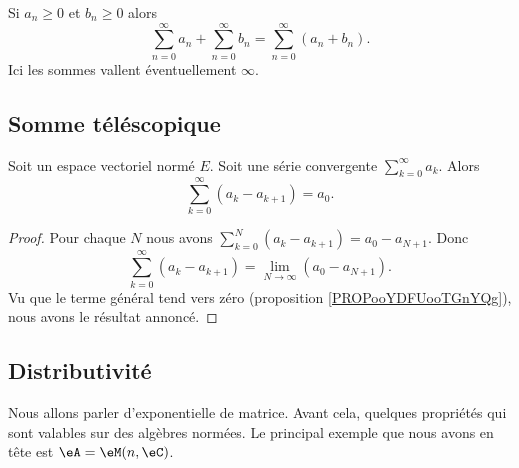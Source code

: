 \begin{proposition}		\label{PROPooQCOBooAMnljj}
	Si \( a_n\geq 0\) et \( b_n\geq 0\) alors
	\begin{equation}
		\sum_{n=0}^{\infty}a_n+\sum_{n=0}^{\infty}b_n=\sum_{n=0}^{\infty}(a_n+b_n).
	\end{equation}
	Ici les sommes vallent éventuellement \( \infty\).
\end{proposition}

\subsection{Somme téléscopique}

\begin{proposition}	\label{PROPooQLOUooTDWfFF}
	Soit un espace vectoriel normé \( E\). Soit une série convergente \( \sum_{k=0}^{\infty}a_k\). Alors
	\begin{equation}
		\sum_{k=0}^{\infty}(a_k-a_{k+1})=a_0.
	\end{equation}
\end{proposition}

\begin{proof}
	Pour chaque \( N\) nous avons \( \sum_{k=0}^N(a_k-a_{k+1})=a_0-a_{N+1}\). Donc
	\begin{equation}
		\sum_{k=0}^{\infty}(a_k-a_{k+1})=\lim_{N\to \infty}(a_0-a_{N+1}).
	\end{equation}
	Vu que le terme général tend vers zéro (proposition \ref{PROPooYDFUooTGnYQg}), nous avons le résultat annoncé.
\end{proof}

\subsection{Distributivité}

Nous allons parler d'exponentielle de matrice. Avant cela, quelques propriétés qui sont valables sur des algèbres normées. Le principal exemple que nous avons en tête est \( \eA=\eM(n,\eC)\).

